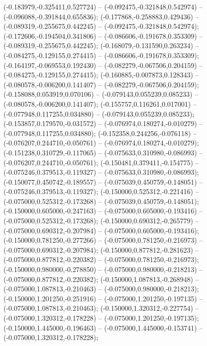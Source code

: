  (-0.183979,-0.325411,0.527724) -- (-0.092475,-0.321848,0.542974) -- (-0.096088,-0.391844,0.655836);
 (-0.177868,-0.258883,0.429436) -- (-0.089319,-0.255675,0.442245) -- (-0.092475,-0.321848,0.542974);
 (-0.172606,-0.194504,0.341806) -- (-0.086606,-0.191678,0.353309) -- (-0.089319,-0.255675,0.442245);
 (-0.168079,-0.131590,0.263234) -- (-0.084275,-0.129155,0.274415) -- (-0.086606,-0.191678,0.353309);
 (-0.164197,-0.069553,0.192430) -- (-0.082279,-0.067506,0.204159) -- (-0.084275,-0.129155,0.274415);
 (-0.160885,-0.007873,0.128343) -- (-0.080578,-0.006200,0.141407) -- (-0.082279,-0.067506,0.204159);
 (-0.158088,0.053919,0.070106) -- (-0.079143,0.055239,0.085233) -- (-0.080578,-0.006200,0.141407);
 (-0.155757,0.116261,0.017001) -- (-0.077948,0.117255,0.034880) -- (-0.079143,0.055239,0.085233);
 (-0.153857,0.179570,-0.031572) -- (-0.076974,0.180274,-0.010279) -- (-0.077948,0.117255,0.034880);
 (-0.152358,0.244256,-0.076118) -- (-0.076207,0.244710,-0.050761) -- (-0.076974,0.180274,-0.010279);
 (-0.151238,0.310729,-0.117065) -- (-0.075633,0.310980,-0.086993) -- (-0.076207,0.244710,-0.050761);
 (-0.150481,0.379411,-0.154775) -- (-0.075246,0.379513,-0.119327) -- (-0.075633,0.310980,-0.086993);
 (-0.150077,0.450742,-0.189557) -- (-0.075039,0.450759,-0.148051) -- (-0.075246,0.379513,-0.119327);
 (-0.150000,0.525312,-0.221416) -- (-0.075000,0.525312,-0.173268) -- (-0.075039,0.450759,-0.148051);
 (-0.150000,0.605000,-0.247163) -- (-0.075000,0.605000,-0.193416) -- (-0.075000,0.525312,-0.173268);
 (-0.150000,0.690312,-0.265779) -- (-0.075000,0.690312,-0.207984) -- (-0.075000,0.605000,-0.193416);
 (-0.150000,0.781250,-0.277266) -- (-0.075000,0.781250,-0.216973) -- (-0.075000,0.690312,-0.207984);
 (-0.150000,0.877812,-0.281623) -- (-0.075000,0.877812,-0.220382) -- (-0.075000,0.781250,-0.216973);
 (-0.150000,0.980000,-0.278850) -- (-0.075000,0.980000,-0.218213) -- (-0.075000,0.877812,-0.220382);
 (-0.150000,1.087813,-0.268948) -- (-0.075000,1.087813,-0.210463) -- (-0.075000,0.980000,-0.218213);
 (-0.150000,1.201250,-0.251916) -- (-0.075000,1.201250,-0.197135) -- (-0.075000,1.087813,-0.210463);
 (-0.150000,1.320312,-0.227754) -- (-0.075000,1.320312,-0.178228) -- (-0.075000,1.201250,-0.197135);
 (-0.150000,1.445000,-0.196463) -- (-0.075000,1.445000,-0.153741) -- (-0.075000,1.320312,-0.178228);
